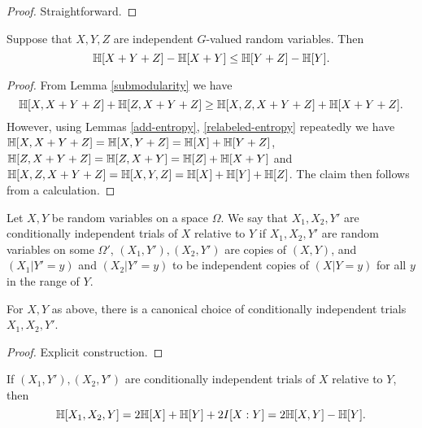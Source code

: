 \begin{proof} Straightforward.
\end{proof}

\begin{lemma}\label{kv}
Suppose that $X, Y, Z$ are independent $G$-valued random variables. Then
\[
  \mathbb{H}[X + Y + Z] - \mathbb{H}[X + Y] \leq \mathbb{H}[Y+Z] - \mathbb{H}[Y].
\]
\end{lemma}

\begin{proof}
From Lemma \ref{submodularity} we have
$$ \mathbb{H}[X, X+Y+Z] + \mathbb{H}[Z, X+Y+Z] \geq \mathbb{H}[X, Z, X+Y+Z] + \mathbb{H}[X+Y+Z].$$
However, using Lemmas \ref{add-entropy}, \ref{relabeled-entropy} repeatedly we have $\mathbb{H}[X, X+Y+Z] = \mathbb{H}[X, Y+Z] = \mathbb{H}[X] + \mathbb{H}[Y+Z]$, $\mathbb{H}[Z, X+Y + Z] = \mathbb{H}[Z, X+Y] = \mathbb{H}[Z] + \mathbb{H}[X+Y]$ and $\mathbb{H}[X, Z, X+Y+Z] = \mathbb{H}[X, Y, Z] = \mathbb{H}[X] + \mathbb{H}[Y] + \mathbb{H}[Z]$.  The claim then follows from a calculation.
\end{proof}

\begin{definition}\label{cond-trial}  Let $X,Y$ be random variables on a space $\Omega$.
  We say that $X_1, X_2, Y'$ are conditionally independent trials of $X$ relative to $Y$ if $X_1,X_2,Y'$ are random variables on some $\Omega'$, $(X_1,Y'), (X_2,Y')$ are copies of $(X,Y)$, and $(X_1 | Y' = y)$ and $(X_2 | Y' = y)$ to be independent copies of $(X | Y = y)$ for all $y$ in the range of $Y$.
\end{definition}

\begin{lemma}\label{cond-indep-exist}
  For $X,Y$ as above, there is a canonical choice of conditionally independent trials $X_1,X_2,Y'$.
\end{lemma}

\begin{proof} Explicit construction.
\end{proof}

\begin{lemma}\label{cond-trial-ent}
  If $(X_1,Y'), (X_2,Y')$ are conditionally
independent trials of $X$ relative to $Y$, then
$$ \mathbb{H}[X_1,X_2,Y] = 2 \mathbb{H}[X] + \mathbb{H}[Y] + 2 I[X:Y] = 2 \mathbb{H}[X,Y] - \mathbb{H}[Y].$$
\end{lemma}

